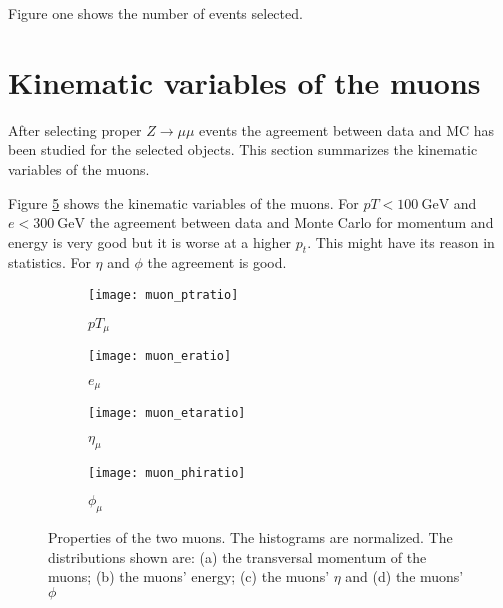 Figure one shows the number of events selected. 

\section{Kinematic variables of the muons}

After selecting proper $Z \rightarrow \mu \mu$ events the agreement between data and MC has been studied for the selected objects. This section summarizes the kinematic variables of the muons.

Figure \ref{fig:muons} shows the kinematic variables of the muons. For $pT<\SI{100}{\GeV}$ and $e<\SI{300}{\GeV}$ the agreement between data and Monte Carlo for momentum and energy is very good but it is worse at a higher $p_t$. This might have its reason in statistics. For $\eta$ and $\phi$ the agreement is good.





\begin{figure}[h]
\centering
\begin{subfigure}[b]{0.5\figwidth}
\texttt{[image: muon\_ptratio]}
\caption[Transversal momentum of the muons]{$pT_{\mu}$}
\label{fig:muonpt}
\end{subfigure}
\quad
\begin{subfigure}[b]{0.5\figwidth}
\texttt{[image: muon\_eratio]}
\caption[Energy of the muons]{$e_{\mu}$}
\label{fig:muone}
\end{subfigure}


\begin{subfigure}[b]{0.5\figwidth}
\texttt{[image: muon\_etaratio]}
\caption[$\eta$ of the muons]{$\eta_{\mu}$}
\label{fig:muoneta}
\end{subfigure}
\quad
\begin{subfigure}[b]{0.5\figwidth}
\texttt{[image: muon\_phiratio]}
\caption[$\phi$ of the muons]{$\phi_{\mu}$}
\label{fig:muonphi}
\end{subfigure}
\caption{Properties of the two muons. The histograms are normalized. The distributions shown are: (a) the transversal momentum of the muons; (b) the muons' energy; (c) the muons' $\eta$ and (d) the muons' $\phi$}
\label{fig:muons}
\end{figure}



